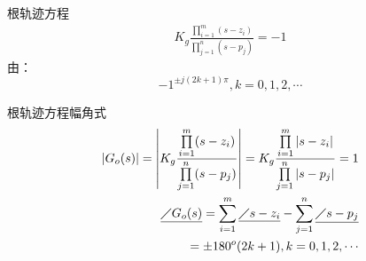  \begin{frame}
 \begin{block}{根轨迹方程}
 \begin{eqnarray*}
K_g\frac{\prod\limits_{i=1}^m(s-z_i)}{\prod\limits_{j=1}^n(s-p_j)}=-1
\end{eqnarray*}
由：
\[-1^{\pm j(2k+1)\pi},k=0,1,2,\cdots\]
\end{block}
\end{frame}

\begin{frame}
\begin{block}{根轨迹方程幅角式}
 \begin{eqnarray*}
\left|G_o(s)\right|=\left|K_g\frac{\prod\limits_{i=1}^m(s-z_i)}{\prod\limits_{j=1}^n(s-p_j)}\right|=K_g\frac{\prod\limits_{i=1}^m\left|s-z_i\right|}{\prod\limits_{j=1}^n\left|s-p_j\right|}=1\\
\underline{\diagup G_o(s)}=\sum\limits_{i=1}^m\underline{\diagup s-z_i}-\sum\limits_{j=1}^n\underline{\diagup s-p_j}\\
=\pm 180^o(2k+1),k=0,1,2,\cdots
\end{eqnarray*}
\end{block}
\end{frame}
